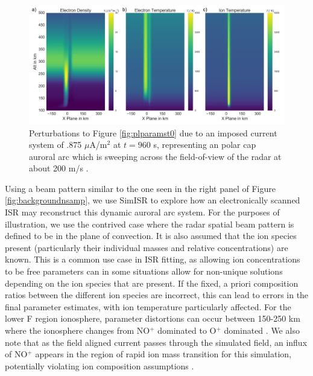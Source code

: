 \begin{figure}[!t]
\centering
\includegraphics[width=6in]{0960_15_int}
\caption{Perturbations to Figure \ref{fig:plparamst0} due to an imposed current system of .875 $\mu$A/m$^2$ at $t=960$ s, representing an polar cap auroral arc which is sweeping across the field-of-view of the radar at about 200 m/s \citep{Perry:2015jf}.}
\label{fig:plparamst60}
\end{figure}

Using a beam pattern similar to the one seen in the right panel of Figure \ref{fig:backgroundnsamp}, we use SimISR to explore how an electronically scanned ISR may reconstruct this dynamic auroral arc system.  For the purposes of illustration, we use the contrived case where the radar spatial beam pattern is defined to be in the plane of convection.  It is also assumed that the ion species present (particularly their individual masses and relative concentrations) are known. This is a common use case in ISR fitting, as allowing ion concentrations to be free parameters can in some situations allow for non-unique solutions depending on the ion species that are present.  If the fixed, a priori composition ratios between the different ion species are incorrect, this can lead to errors in the final parameter estimates, with ion temperature particularly affected. For the lower F region ionosphere, parameter distortions can occur between 150-250 km where the ionosphere changes from NO$^+$ dominated to O$^+$ dominated \citep{Zettergren:2011ej,Blelly:2010gf}. We also note that as the field aligned current passes through the simulated field, an influx of NO$^+$ appears in the region of rapid ion mass transition for this simulation, potentially violating ion composition assumptions \citep{Perry:2015jf}.

